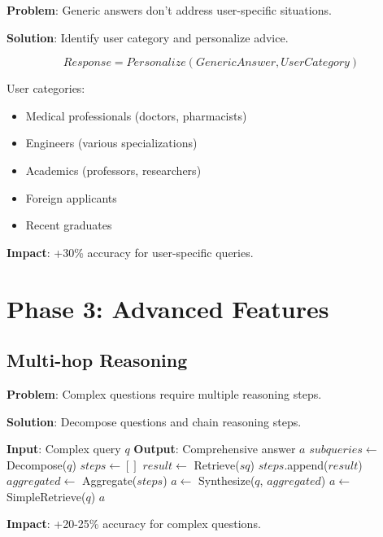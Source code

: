 \documentclass[12pt,a4paper]{article}
\begin{document}
\textbf{Problem}: Generic answers don't address user-specific situations.

\textbf{Solution}: Identify user category and personalize advice.

\begin{equation}
Response = Personalize(GenericAnswer, UserCategory)
\end{equation}

User categories:
\begin{itemize}
    \item Medical professionals (doctors, pharmacists)
    \item Engineers (various specializations)
    \item Academics (professors, researchers)
    \item Foreign applicants
    \item Recent graduates
\end{itemize}

\textbf{Impact}: +30\% accuracy for user-specific queries.

\section{Phase 3: Advanced Features}

\subsection{Multi-hop Reasoning}

\textbf{Problem}: Complex questions require multiple reasoning steps.

\textbf{Solution}: Decompose questions and chain reasoning steps.

\begin{algorithm}
\caption{Multi-hop Reasoning}
\begin{algorithmic}
\STATE \textbf{Input}: Complex query $q$
\STATE \textbf{Output}: Comprehensive answer $a$
\STATE
{}
    \STATE $subqueries \gets$ Decompose($q$)
    \STATE $steps \gets []$
        \STATE $result \gets$ Retrieve($sq$)
        \STATE $steps$.append($result$)
    \ENDFOR
    \STATE $aggregated \gets$ Aggregate($steps$)
    \STATE $a \gets$ Synthesize($q$, $aggregated$)
\ELSE
    \STATE $a \gets$ SimpleRetrieve($q$)
\ENDIF
\RETURN $a$
\end{algorithmic}
\end{algorithm}

\textbf{Impact}: +20-25\% accuracy for complex questions.
\end{document}
